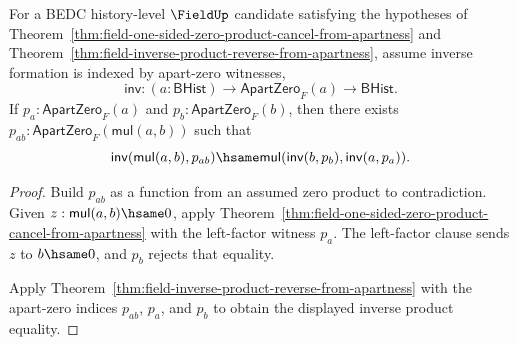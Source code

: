\begin{theorem}
\label{thm:field-product-apartness-inverse-product-reverse}
For a BEDC history-level $\FieldUp$ candidate satisfying the hypotheses of
Theorem~\ref{thm:field-one-sided-zero-product-cancel-from-apartness} and
Theorem~\ref{thm:field-inverse-product-reverse-from-apartness}, assume
inverse formation is indexed by apart-zero witnesses,
$$
\mathsf{inv}:(a:\mathsf{BHist})\to\mathsf{ApartZero}_F(a)\to\mathsf{BHist}.
$$
If $p_a:\mathsf{ApartZero}_F(a)$ and $p_b:\mathsf{ApartZero}_F(b)$, then
there exists
$p_{ab}:\mathsf{ApartZero}_F(\mathsf{mul}(a,b))$ such that
$$
\mathsf{inv}(\mathsf{mul}(a,b),p_{ab})\hsame
\mathsf{mul}(\mathsf{inv}(b,p_b),\mathsf{inv}(a,p_a)).
$$
\end{theorem}
\begin{proof}
Build $p_{ab}$ as a function from an assumed zero product to contradiction.
Given $z:\mathsf{mul}(a,b)\hsame0$, apply
Theorem~\ref{thm:field-one-sided-zero-product-cancel-from-apartness} with the
left-factor witness $p_a$. The left-factor clause sends $z$ to $b\hsame0$,
and $p_b$ rejects that equality.

Apply Theorem~\ref{thm:field-inverse-product-reverse-from-apartness} with the
apart-zero indices $p_{ab}$, $p_a$, and $p_b$ to obtain the displayed inverse
product equality.
\end{proof}

